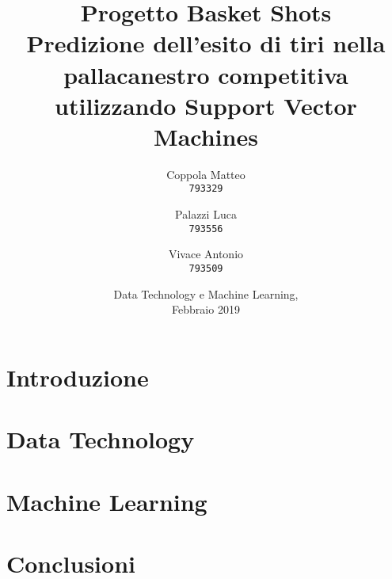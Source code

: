 \documentclass[12pt,a4paper]{report}
\begin{document}
\title{%
  \Huge Progetto Basket Shots\\
  \large Predizione dell'esito di tiri nella pallacanestro competitiva utilizzando Support Vector Machines\\
    }
\author{
  Coppola Matteo\\
  \texttt{793329}
  \and
  Palazzi Luca\\
  \texttt{793556}
   \and
  Vivace Antonio\\
  \texttt{793509}
}
\date{Data Technology e Machine Learning, \\ Febbraio 2019}
\maketitle

\tableofcontents

\chapter{Introduzione}


\chapter{Data Technology}





\chapter{Machine Learning}





\chapter{Conclusioni}



\end{document}
